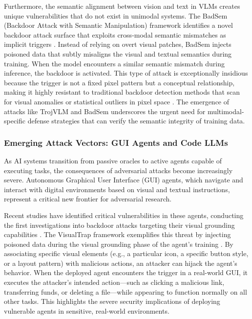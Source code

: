 \documentclass[11pt,a4paper]{article}
\begin{document}
Furthermore, the semantic alignment between vision and text in VLMs creates unique vulnerabilities that do not exist in unimodal systems. The BadSem (Backdoor Attack with Semantic Manipulation) framework identifies a novel backdoor attack surface that exploits cross-modal semantic mismatches as implicit triggers \cite{Zhong_2025_Backdoor}. Instead of relying on overt visual patches, BadSem injects poisoned data that subtly misaligns the visual and textual semantics during training. When the model encounters a similar semantic mismatch during inference, the backdoor is activated. This type of attack is exceptionally insidious because the trigger is not a fixed pixel pattern but a conceptual relationship, making it highly resistant to traditional backdoor detection methods that scan for visual anomalies or statistical outliers in pixel space \cite{Zhong_2025_Backdoor}. The emergence of attacks like TrojVLM and BadSem underscores the urgent need for multimodal-specific defense strategies that can verify the semantic integrity of training data.

\subsubsection{Emerging Attack Vectors: GUI Agents and Code LLMs}

As AI systems transition from passive oracles to active agents capable of executing tasks, the consequences of adversarial attacks become increasingly severe. Autonomous Graphical User Interface (GUI) agents, which navigate and interact with digital environments based on visual and textual instructions, represent a critical new frontier for adversarial research. 

Recent studies have identified critical vulnerabilities in these agents, conducting the first investigations into backdoor attacks targeting their visual grounding capabilities \cite{Ye_2025_Visualtrap}. The VisualTrap framework exemplifies this threat by injecting poisoned data during the visual grounding phase of the agent's training \cite{Ye_2025_Visualtrap}. By associating specific visual elements (e.g., a particular icon, a specific button style, or a layout pattern) with malicious actions, an attacker can hijack the agent's behavior. When the deployed agent encounters the trigger in a real-world GUI, it executes the attacker's intended action---such as clicking a malicious link, transferring funds, or deleting a file---while appearing to function normally on all other tasks. This highlights the severe security implications of deploying vulnerable agents in sensitive, real-world environments.
\end{document}
